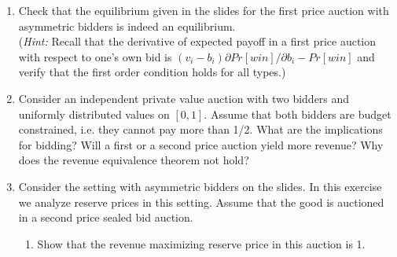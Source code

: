 \documentclass[a4paper,12pt]{article}
\begin{document}
\begin{enumerate}[resume]
\item Check that the equilibrium given in the slides for the first price auction with asymmetric bidders is indeed an equilibrium.\\
  (\emph{Hint: }Recall that the derivative of expected payoff in a first price auction with respect to one's own bid is $(v_i-b_i)\partial Pr[win]/\partial b_i-Pr[win]$ and verify that the first order condition holds for all types.)
\item Consider an independent private value auction with two bidders and uniformly distributed values on $[0,1]$. Assume that both bidders are budget constrained, i.e. they cannot pay more than 1/2. What are the implications for bidding? Will a first or a second price auction yield more revenue?  Why does the revenue equivalence theorem not hold?
\item Consider the setting with asymmetric bidders on the slides. In this exercise we analyze reserve prices in this setting. Assume that the good is auctioned in a second price sealed bid auction.
  \begin{enumerate}
  \item Show that the revenue maximizing reserve price in this auction is 1.

\end{enumerate}
\end{enumerate}
\end{document}
